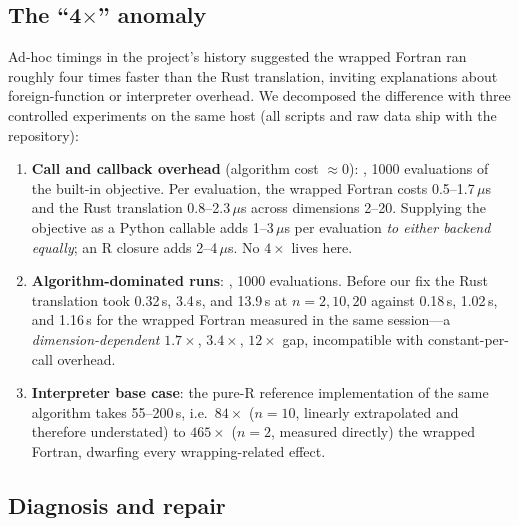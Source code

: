 \subsection{The ``4$\times$'' anomaly}

Ad-hoc timings in the project's history suggested the wrapped Fortran
 ran roughly four times faster than the Rust translation,
inviting explanations about foreign-function or interpreter overhead. We
decomposed the difference with three controlled experiments on the same
host (all scripts and raw data ship with the repository):

\begin{enumerate}
\item \textbf{Call and callback overhead} (algorithm cost
  $\approx 0$): , 1000 evaluations of the built-in
   objective. Per evaluation, the wrapped Fortran costs
  0.5--1.7\,$\mu$s and the Rust translation 0.8--2.3\,$\mu$s across
  dimensions 2--20. Supplying the objective as a Python callable adds
  1--3\,$\mu$s per evaluation \emph{to either backend equally}; an R
  closure adds 2--4\,$\mu$s. No $4\times$ lives here.
\item \textbf{Algorithm-dominated runs}: , 1000
  evaluations. Before our fix the Rust translation took 0.32\,s,
  3.4\,s, and 13.9\,s at $n=2,10,20$ against 0.18\,s, 1.02\,s, and
  1.16\,s for the wrapped Fortran measured in the same session---a
  \emph{dimension-dependent} $1.7\times$, $3.4\times$, $12\times$
  gap, incompatible with constant-per-call overhead.
\item \textbf{Interpreter base case}: the pure-R reference
  implementation of the same algorithm takes 55--200\,s, i.e.\
  $84\times$ ($n{=}10$, linearly extrapolated and therefore
  understated) to $465\times$ ($n{=}2$, measured directly) the wrapped
  Fortran, dwarfing every wrapping-related effect.
\end{enumerate}

\subsection{Diagnosis and repair}

